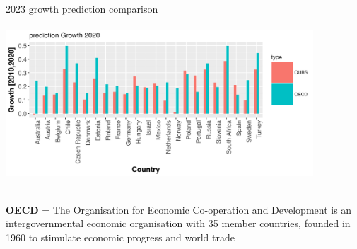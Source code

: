 \documentclass[9pt]{beamer}
\begin{document}
\begin{frame}{2023 growth prediction comparison}
	\includegraphics[height=6.5cm,width=11.5cm]{OECD.png}
	
	
	\textbf{OECD} = The Organisation for Economic Co-operation and Development  is an intergovernmental economic organisation with 35 member countries, founded in 1960 to stimulate economic progress and world trade
\end{frame}
\end{document}
